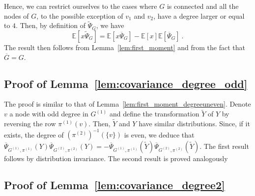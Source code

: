 \documentclass{article}
\begin{document}
        Hence, we can restrict ourselves to the cases where $G$ is connected and all the nodes of $G$, to the possible exception of $v_1$ and $v_2$, have a degree larger or equal to $4$. Then, by definition of $\widetilde{\Psi}_G$, we have 
        \[
        \mathbb{E}[x\widetilde{\Psi}_G]= \mathbb{E}[x\overline{\Psi}_G]- \mathbb{E}[x]\mathbb{E}[\overline{\Psi}_G]\ . 
        \]
        The result then follows from Lemma~\ref{lem:first_moment} and from the fact that $\overline{G}=G$. 
        
    

    
    
    
    \subsection{Proof of Lemma~\ref{lem:covariance_degree_odd}}
        The proof is similar to that of  Lemma~\ref{lem:first_moment_degreeuneven}. Denote $v$ a node with odd degree in $G^{(1)}$ and define the transformation $\tilde{Y}$ of $Y$ by reversing the row $\pi^{(1)}(v)$. Then, $\tilde{Y}$ and $Y$ have similar distributions. Since, if it exists, the degree of $(\pi^{(2)})^{-1}(\{v\})$ is even, we deduce that $\overline{\Psi}_{G^{(1)},\pi^{(1)}}(Y) \overline{\Psi}_{G^{(2)},\pi^{(2)}}(Y)= -\overline{\Psi}_{G^{(1)},\pi^{(1)}}(\tilde{Y}) \overline{\Psi}_{G^{(2)},\pi^{(2)}}(\tilde{Y})$. The first result follows by distribution invariance. The second result is proved analogously
        
        


    \subsection{Proof of Lemma~\ref{lem:covariance_degree2}}
\end{document}
